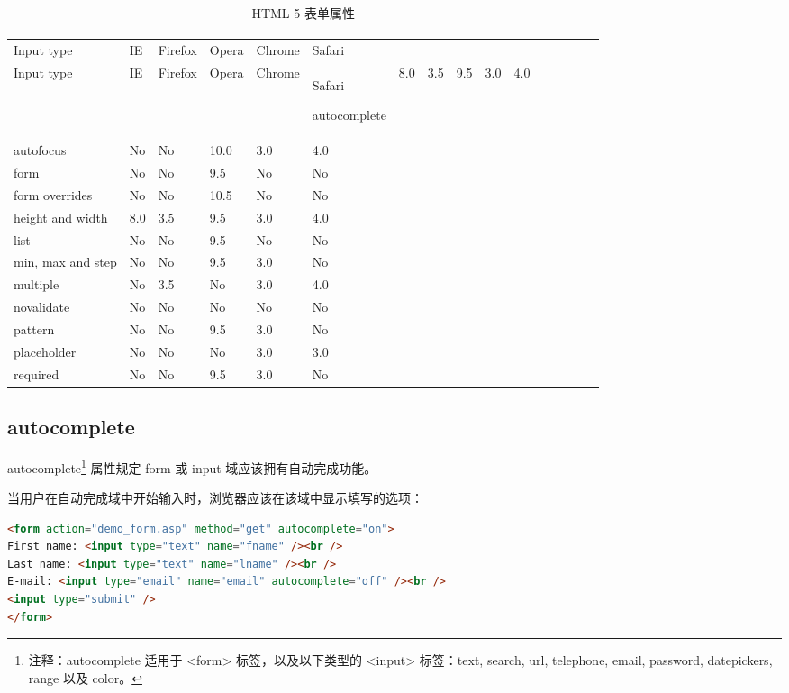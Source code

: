 \begin{longtable}{|p{80pt}|p{50pt}|p{50pt}|p{50pt}|p{50pt}|p{50pt}|}
\tabularnewline\hline
Input type	&IE	&Firefox	&Opera	&Chrome	&Safari
\endhead

\caption{HTML 5 表单属性}\\
\hline
Input type	&IE	&Firefox	&Opera	&Chrome	&Safari
\endfirsthead

\endfoot

\endlastfoot
\hline
autocomplete	&8.0	&3.5	&9.5	&3.0	&4.0\\
\hline
autofocus	&No		&No		&10.0	&3.0	&4.0\\
\hline
form			&No		&No		&9.5	&No		&No\\
\hline
form overrides	&No		&No		&10.5	&No		&No\\
\hline
height and width&	8.0	&3.5	&9.5	&3.0	&4.0\\
\hline
list			&No		&No		&9.5	&No		&No\\
\hline
min, max and step&	No	&No		&9.5	&3.0	&No\\
\hline
multiple		&No		&3.5	&No		&3.0	&4.0\\
\hline
novalidate	&No		&No		&No		&No		&No\\
\hline
pattern		&No		&No		&9.5	&3.0	&No\\
\hline
placeholder	&No		&No		&No		&3.0	&3.0\\
\hline
required		&No		&No		&9.5	&3.0	&No\\
\hline

\end{longtable}



\subsection{autocomplete}

autocomplete\footnote{注释：autocomplete 适用于 <form> 标签，以及以下类型的 <input> 标签：text, search, url, telephone, email, password, datepickers, range 以及 color。} 属性规定 form 或 input 域应该拥有自动完成功能。

当用户在自动完成域中开始输入时，浏览器应该在该域中显示填写的选项：

\begin{lstlisting}[language=HTML]
<form action="demo_form.asp" method="get" autocomplete="on">
First name: <input type="text" name="fname" /><br />
Last name: <input type="text" name="lname" /><br />
E-mail: <input type="email" name="email" autocomplete="off" /><br />
<input type="submit" />
</form>
\end{lstlisting}

